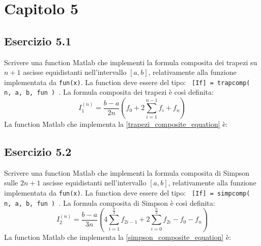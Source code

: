 \section{Capitolo 5}

	\subsection{Esercizio 5.1}
Scrivere una function Matlab che implementi la formula composita dei trapezi su $n+1$ ascisse equidistanti nell'intervallo $[a, b]$, relativamente alla funzione implementata da \texttt{fun(x)}. 
La function deve essere del tipo: \texttt{ [If] = trapcomp( n, a, b, fun ) }.
La formula composita dei trapezi è così definita:
\begin{equation}\label{trapezi_composite_equation}
	I_1^{(n)} = \frac{b-a}{2n} (f_0 + 2\sum_{i=1}^{n-1}f_i + f_n)
\end{equation}
La function Matlab che implementa la \ref{trapezi_composite_equation} è:


	\subsection{Esercizio 5.2}
Scrivere una function Matlab che implementi la formula composita di Simpson sulle $2n+1$ ascisse equidistanti nell'intervallo $[a, b]$, relativamente alla funzione implementata da \texttt{fun(x)}. 
La function deve essere del tipo: \texttt{ [If] = simpcomp( n, a, b, fun ) }.
La formula composita di Simpson è così definita:
\begin{equation}\label{simpson_composite_equation}
	I_2^{(n)} = \frac{b-a}{3n} (4\sum_{i=1}^{\frac{n}{2}}f_{2i-1} +2\sum_{i=0}^{\frac{n}{2}}f_{2i} - f_0 - f_n)
\end{equation}
La function Matlab che implementa la \ref{simpson_composite_equation} è:


